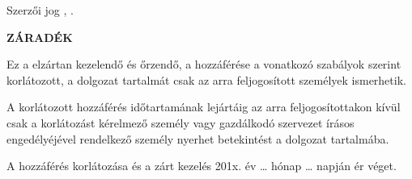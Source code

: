 \begin{flushleft}
Szerzői jog {\textcopyright} \szerzo, \the\year.
\end{flushleft}

\vspace{0.5cm}

\begin{center}
\textbf{ZÁRADÉK}\\
\end{center}

\vspace{0.5cm}

Ez a \MakeLowercase{\gpkmunkatipus} elzártan kezelendő és őrzendő, a hozzáférése a vonatkozó szabályok szerint korlátozott, a dolgozat tartalmát csak az arra feljogosított személyek ismerhetik.

A korlátozott hozzáférés időtartamának lejártáig az arra feljogosítottakon kívül csak a korlátozást kérelmező személy vagy gazdálkodó szervezet írásos engedélyéjével rendelkező személy nyerhet betekintést a dolgozat tartalmába.

\vspace{0.3cm}

A hozzáférés korlátozása és a zárt kezelés 201x. év … hónap … napján ér véget.

\vfill
\clearpage
\thispagestyle{empty} %

\selectthesislanguage
